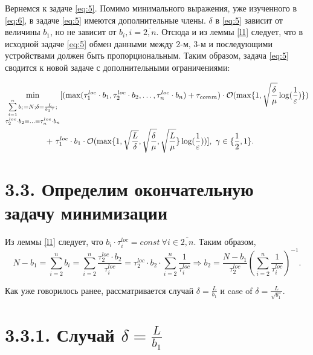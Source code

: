 \documentclass{article}
\theoremstyle{definition}
\theoremstyle{plain}
\begin{document}
Вернемся к задаче \eqref{eq:5}. Помимо минимального выражения, уже изученного в \eqref{eq:6}, в задаче \eqref{eq:5} имеются дополнительные члены.  $\delta$ в \eqref{eq:5} зависит от величины $b_1$, но не зависит от $b_i, i = \overline{2, n}$. Отсюда и из леммы \ref{l1} следует, что в исходной задаче \eqref{eq:5} обмен данными между 2-м, 3-м и последующими устройствами должен быть пропорциональным. Таким образом, задача \eqref{eq:5} сводится к новой задаче с дополнительными ограничениями:


\begin{eqnarray}
    \begin{split}
    \label{eq:7}
        \min_{\substack{\sum\limits_{i = 1}^{n} b_i = N; \delta = \frac{L}{{b_1}^\gamma};  \\
        \tau_2^{loc}\cdot b_2 = \ldots = \tau_n^{loc}\cdot b_n }} 
        [(\max(\tau_1^{loc}\cdot b_1, \tau_2^{loc}\cdot b_2, \ldots , \tau_n^{loc}\cdot b_n) + \tau_{comm})\cdot \mathcal O(\max\{1, \sqrt{\frac{\delta}{\mu}}\log(\frac{1}{\varepsilon})\})
        \\ + ~
        \tau_1^{loc}\cdot b_1\cdot\mathcal O(\max\{1,\sqrt{\frac{L}{\delta}}, \sqrt{\frac{\delta}{\mu}}, \sqrt{\frac{L}{\mu}}\}\log(\frac{1}{\varepsilon}))] ,  ~ \gamma \in \{\frac{1}{2}, 1\}. \hspace{2.4cm}
    \end{split}
\end{eqnarray}

    

\section*{3.3. Определим окончательную задачу минимизации}
Из леммы \ref{l1} следует, что $b_i\cdot \tau_i^{loc} = const ~ \forall i \in \overline{2, n}$.
Таким образом, $$ N - b_1 = \sum\limits_{i = 2}^{n} b_i = \sum\limits_{i = 2}^{n} \frac{\tau_2^{loc}\cdot b_2}{\tau_i^{loc}} = \tau_2^{loc}\cdot b_2 \cdot \sum\limits_{i = 2}^{n} \frac{1}{\tau_i^{loc}} \Rightarrow
b_2 = \frac{N - b_1}{\tau_2 ^{loc}}(\sum\limits_{i = 2}^{n} \frac{1}{\tau_i^{loc}})^{-1}.$$

Как уже говорилось ранее, рассматривается случай $\delta = \frac{L}{b_1}$ и case of $\delta = \frac{L}{\sqrt{b_1}}$.

\section*{3.3.1. Случай $\delta = \frac{L}{b_1}$}
\end{document}
